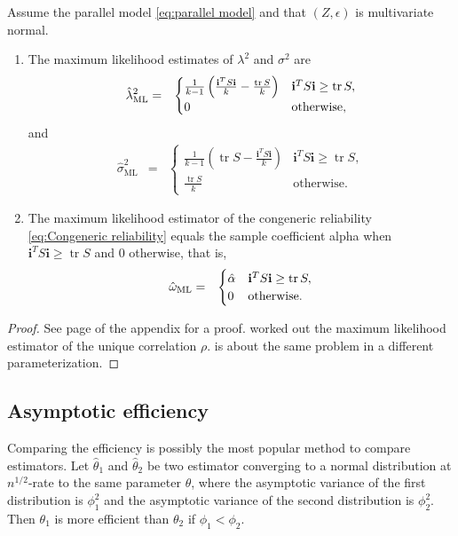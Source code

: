 \documentclass[twoside]{article}
\DeclareMathOperator{\tr}{tr}
\begin{document}
\begin{thm}\label{thm:ML}
Assume the parallel model \eqref{eq:parallel model} and that $(Z,\epsilon)$ is multivariate normal. 
\begin{enumerate}[label=(\roman*)]
\item The maximum likelihood estimates of $\lambda^{2}$
and $\sigma^{2}$ are 
\begin{eqnarray*}
\hat{\lambda}^2_\textrm{ML} & = & \begin{cases}
\frac{1}{k-1}\left(\frac{\mathbf{i}^{T}S\mathbf{i}}{k}-\frac{\tr{S}}{k}\right) & \mathbf{i}^{T}S\mathbf{i}\geq\tr{S},\\
0 & \text{\textrm{otherwise}},
\end{cases}\\
\end{eqnarray*}
and
\begin{eqnarray*}
\hat{\sigma}^2_\textrm{ML} & = & \begin{cases}
\frac{1}{k-1}\left(\tr{S}-\frac{\mathbf{i}^{T}S\mathbf{i}}{k}\right) & \mathbf{i}^{T}S\mathbf{i}\geq\tr{S},\\
\frac{\tr{S}}{k} & \textrm{otherwise}.
\end{cases}
\end{eqnarray*}
\item The maximum likelihood estimator of the congeneric reliability
\eqref{eq:Congeneric reliability} equals the sample coefficient alpha
when $\mathbf{i}^{T}S\mathbf{i}\geq\tr{S}$ and $0$ otherwise, that is,
\begin{eqnarray*}
\hat{\omega}_\textrm{ML} & = & \begin{cases}
\hat{\alpha} & \mathbf{i}^{T}S\mathbf{i}\geq\tr{S},\\
0 & \text{\textrm{otherwise}}.
\end{cases}
\end{eqnarray*}
\end{enumerate}
\end{thm}
\begin{proof}
See page \pageref{proof:ML} of the appendix for a proof. \citet[][section B]{Kristof1963-tb} worked out the maximum likelihood estimator of the unique correlation $\rho$. \citep[][Exercise 3.9, p. 114]{Muirhead2009-kq} is about the same problem in a different parameterization.
\end{proof}

\subsection{Asymptotic efficiency}
Comparing the efficiency is possibly the most popular method to compare estimators. Let $\hat{\theta}_1$ and $\hat{\theta}_2$ be two estimator converging to a normal distribution at $n^{1/2}$-rate to the same parameter $\theta$,  where the asymptotic variance of the first distribution is $\phi_1^2$ and the asymptotic variance of the second distribution is $\phi_2^2$. Then $\theta_1$ is more efficient than $\theta_2$ if $\phi_1<\phi_2$. 
\end{document}
